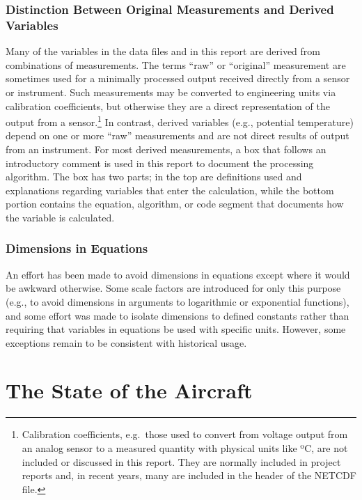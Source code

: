 \documentclass[
]{book}
\begin{document}
\hypertarget{distinction-between-original-measurements-and-derived-variables}{%
\subsection{Distinction Between Original Measurements and Derived Variables}\label{distinction-between-original-measurements-and-derived-variables}}

Many of the variables in the data files and in this report are derived from combinations of measurements. The terms ``raw'' or ``original'' measurement are sometimes used for a minimally processed output received directly from a sensor or instrument. Such measurements may be converted to engineering units via calibration coefficients, but otherwise they are a direct representation of the output from a sensor.\footnote{Calibration coefficients, e.g.~those used to convert from voltage output from an analog sensor to a measured quantity with physical units like {º}C, are not included or discussed in this report. They are normally included in project reports and, in recent years, many are included in the header of the NETCDF file.}
In contrast, derived variables (e.g., potential temperature) depend on one or more ``raw'' measurements and are not direct results of output from an instrument. For most derived measurements, a box that follows an introductory comment is used in this report to document the processing algorithm. The box has two parts; in the top are definitions used and explanations regarding variables that enter the calculation, while the bottom portion contains the equation, algorithm, or code segment that documents how the variable is calculated.

\hypertarget{dimensions-in-equations}{%
\subsection{Dimensions in Equations}\label{dimensions-in-equations}}

An effort has been made to avoid dimensions in equations except where it would be awkward otherwise. Some scale factors are introduced for only this purpose (e.g., to avoid dimensions in arguments to logarithmic or exponential functions), and some effort was made to isolate dimensions to defined constants rather than requiring that variables in equations be used with specific units. However, some exceptions remain to be consistent with historical usage.

\hypertarget{the-state-of-the-aircraft}{%
\chapter{The State of the Aircraft}\label{the-state-of-the-aircraft}}
\end{document}
